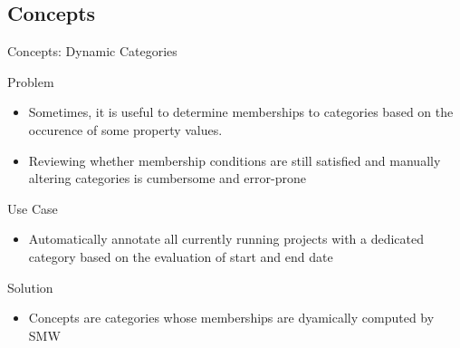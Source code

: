 \documentclass[aspectratio=1610,onlymath]{beamer}
\begin{document}
\subsection{Concepts} %


\begin{frame}[fragile]{Concepts: Dynamic Categories}

%


\bigskip
Problem
\begin{itemize}
	\item Sometimes, it is useful to determine memberships to categories based on the occurence of some property values.
	\item Reviewing whether membership conditions are still satisfied and manually altering categories is cumbersome and error-prone
\end{itemize}

\bigskip
Use Case
\begin{itemize}
	\item Automatically annotate all currently running projects with a dedicated category based on the evaluation of start and end date
\end{itemize}

\bigskip
Solution 
\begin{itemize}
	\item \alert{Concepts} are categories whose memberships are dyamically computed by SMW
\end{itemize}


\end{frame}
\end{document}
